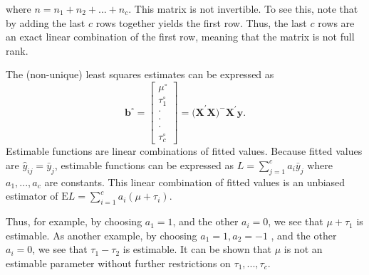 \noindent where $n=n_1+n_2+...+n_{c}$. This matrix is not
invertible. To see this, note that by adding the last $c$ rows
together yields the first row. Thus, the last $c$ rows are an exact
linear combination of the first row, meaning that the matrix is not
full rank.

The (non-unique) least squares estimates can be expressed as
\begin{equation*}
\mathbf{b}^{\circ }=%
\begin{bmatrix}
\mu ^{\circ } \\
\tau_1^{\circ } \\
\cdot  \\
\cdot  \\
\cdot  \\
\tau_c^{\circ }%
\end{bmatrix}%
=\mathbf{(X}^{\prime }\mathbf{X)}^{-}\mathbf{X}^{\prime }\mathbf{y.}
\end{equation*}
Estimable functions are linear combinations of fitted values.
Because fitted values are $\hat{y}_{ij}=\bar{y}_{j}$, estimable
functions can be expressed as $ L=\sum_{j=1}^{c}a_i\bar{y}_{j} $
where $a_1,...,a_{c}$ are constants. This linear combination of
fitted values is an unbiased estimator of $\text{E
}L=\sum_{i=1}^{c}a_i(\mu +\tau_i). $

Thus, for example, by choosing $a_1=1$, and the other $a_i=0$, we
see that $\mu
+\tau_1$ is estimable. As another example, by choosing $a_1=1,a_2=-1$%
, and the other $a_i=0$, we see that $\tau_1-\tau_2$ is estimable.
It can be shown that $\mu $ is not an estimable parameter without
further restrictions on $\tau_1,...,\tau_c$.
